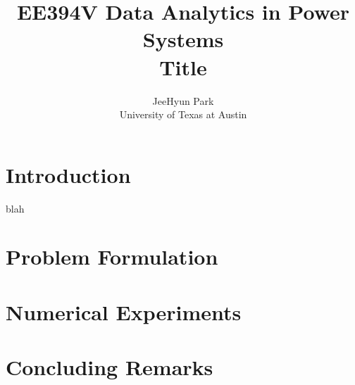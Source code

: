 \documentclass [11pt]{article}
\title{\textbf{EE394V Data Analytics in Power Systems\\\medskip Title}}
\author{JeeHyun Park\\University of Texas at Austin}
\begin{document}
\maketitle
\nocite{*}


\section{Introduction}
blah \cite{Velickovic2018GraphAN}

\section{Problem Formulation}


\section{Numerical Experiments}


\section{Concluding Remarks}



\end{document}
